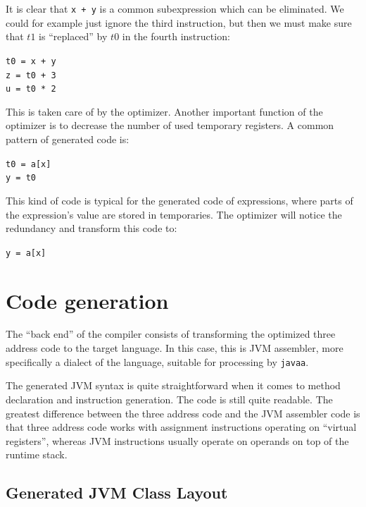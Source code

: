 \documentclass[a4paper]{article}
\begin{document}
It is clear that \texttt{x + y} is a common subexpression which can be
eliminated. We could for example just ignore the third instruction, but then
we must make sure that $t1$ is ``replaced'' by $t0$ in the fourth instruction:\\
\begin{center}
\texttt{t0 = x + y}\\
\texttt{z = t0 + 3}\\
\texttt{u = t0 * 2}\\
\end{center}

This is taken care of by the optimizer. Another important function of the
optimizer is to decrease the number of used temporary registers. A common
pattern of generated code is:
\begin{center}
\texttt{t0 = a[x]}\\
\texttt{y = t0}\\
\end{center}

This kind of code is typical for the generated code of expressions, where
parts of the expression's value are stored in temporaries. The optimizer will
notice the redundancy and transform this code to:\\
\begin{center}
\texttt{y = a[x]}\\
\end{center}

\section{Code generation}

The ``back end'' of the compiler consists of transforming the optimized three
address code to the target language. In this case, this is JVM assembler, more
specifically a dialect of the language, suitable for processing by
\texttt{javaa}.

The generated JVM syntax is quite straightforward when it comes to method
declaration and instruction generation. The code is still quite readable.
The greatest difference between the three address code and the JVM assembler
code is that three address code works with assignment instructions operating
on ``virtual registers'', whereas JVM instructions usually operate on operands
on top of the runtime stack.

\subsection{Generated JVM Class Layout}
\end{document}
